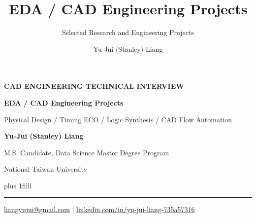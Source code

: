 \documentclass[aspectratio=169,10pt]{beamer}
\title[CAD Technical Interview]{EDA / CAD Engineering Projects}
\subtitle{Selected Research and Engineering Projects}
\author{Yu-Jui (Stanley) Liang}
\institute{National Taiwan University}
\date{}
\newcommand{\smalllabel}[1]{{\scriptsize\bfseries\color{Accent}\MakeUppercase{#1}}}
\newcommand{\slidenavigation}{}
\newcommand{\slideposition}{}
\begin{document}


{
\renewcommand{\slidenavigation}{\hyperlink{details-index}{\beamerbutton{Details index}}}
\renewcommand{\slideposition}{Summary 1 / 18}
\begin{frame}[plain,label=summary-1]
  \vspace*{1.65cm}
  \smalllabel{CAD Engineering Technical Interview}\par
  \vspace{0.51cm}
  {\raggedright\fontsize{21}{27}\selectfont\bfseries\color{Ink}
    EDA / CAD Engineering Projects\par}
  \vspace{0.29cm}
  {\normalsize\color{Muted}Physical Design \enspace / \enspace Timing ECO \enspace / \enspace Logic Synthesis \enspace / \enspace CAD Flow Automation\par}
  \vspace{0.70cm}
  {\Large\bfseries\color{Ink}Yu-Jui (Stanley) Liang}\par
  \vspace{0.10cm}
  {\normalsize\color{Muted}M.S. Candidate, Data Science Master Degree Program\par}
  {\normalsize\color{Muted}National Taiwan University\par}
  \vskip0pt plus 1filll
  {\color{Accent}\rule{\textwidth}{0.7pt}}\par
  \vspace{0.16cm}
  {\small\href{mailto:liangyujui@gmail.com}{liangyujui@gmail.com}
     \quad | \quad
     \href{https://www.linkedin.com/in/yu-jui-liang-735a57316}{linkedin.com/in/yu-jui-liang-735a57316}\par}
  \vspace*{0.55cm}
\end{frame}}
\end{document}
